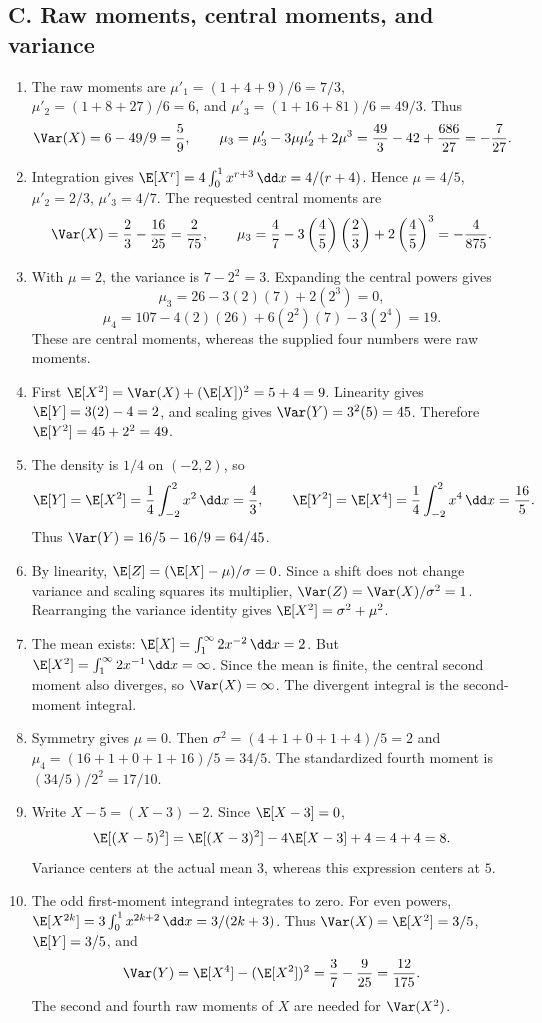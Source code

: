 \subsection{C. Raw moments, central moments, and variance}
\begin{enumerate}[label=\textbf{C\arabic*.},leftmargin=*,itemsep=1em]
\item The raw moments are $\mu'_1=(1+4+9)/6=7/3$, $\mu'_2=(1+8+27)/6=6$, and $\mu'_3=(1+16+81)/6=49/3$. Thus
\[
\Var(X)=6-49/9=\frac59,\qquad
\mu_3=\mu'_3-3\mu\mu'_2+2\mu^3
=\frac{49}{3}-42+\frac{686}{27}=-\frac7{27}.
\]
\item Integration gives $\E[X^r]=4\int_0^1x^{r+3}\,\dd x=4/(r+4)$. Hence $\mu=4/5$, $\mu'_2=2/3$, $\mu'_3=4/7$. The requested central moments are
\[
\Var(X)=\frac23-\frac{16}{25}=\frac2{75},\qquad
\mu_3=\frac47-3\left(\frac45\right)\left(\frac23\right)+2\left(\frac45\right)^3=-\frac4{875}.
\]
\item With $\mu=2$, the variance is $7-2^2=3$. Expanding the central powers gives
\[
\mu_3=26-3(2)(7)+2(2^3)=0,
\]
\[
\mu_4=107-4(2)(26)+6(2^2)(7)-3(2^4)=19.
\]
These are central moments, whereas the supplied four numbers were raw moments.
\item First $\E[X^2]=\Var(X)+(\E[X])^2=5+4=9$. Linearity gives $\E[Y]=3(2)-4=2$, and scaling gives $\Var(Y)=3^2(5)=45$. Therefore $\E[Y^2]=45+2^2=49$.
\item The density is $1/4$ on $(-2,2)$, so
\[
\E[Y]=\E[X^2]=\frac14\int_{-2}^2x^2\,\dd x=\frac43,\qquad
\E[Y^2]=\E[X^4]=\frac14\int_{-2}^2x^4\,\dd x=\frac{16}{5}.
\]
Thus $\Var(Y)=16/5-16/9=64/45$.
\item By linearity, $\E[Z]=(\E[X]-\mu)/\sigma=0$. Since a shift does not change variance and scaling squares its multiplier, $\Var(Z)=\Var(X)/\sigma^2=1$. Rearranging the variance identity gives $\E[X^2]=\sigma^2+\mu^2$.
\item The mean exists: $\E[X]=\int_1^\infty2x^{-2}\,\dd x=2$. But $\E[X^2]=\int_1^\infty2x^{-1}\,\dd x=\infty$. Since the mean is finite, the central second moment also diverges, so $\Var(X)=\infty$. The divergent integral is the second-moment integral.
\item Symmetry gives $\mu=0$. Then $\sigma^2=(4+1+0+1+4)/5=2$ and $\mu_4=(16+1+0+1+16)/5=34/5$. The standardized fourth moment is $(34/5)/2^2=17/10$.
\item Write $X-5=(X-3)-2$. Since $\E[X-3]=0$,
\[
\E[(X-5)^2]=\E[(X-3)^2]-4\E[X-3]+4=4+4=8.
\]
Variance centers at the actual mean $3$, whereas this expression centers at $5$.
\item The odd first-moment integrand integrates to zero. For even powers, $\E[X^{2k}]=3\int_0^1x^{2k+2}\,\dd x=3/(2k+3)$. Thus $\Var(X)=\E[X^2]=3/5$, $\E[Y]=3/5$, and
\[
\Var(Y)=\E[X^4]-(\E[X^2])^2=\frac37-\frac9{25}=\frac{12}{175}.
\]
The second and fourth raw moments of $X$ are needed for $\Var(X^2)$.
\end{enumerate}

